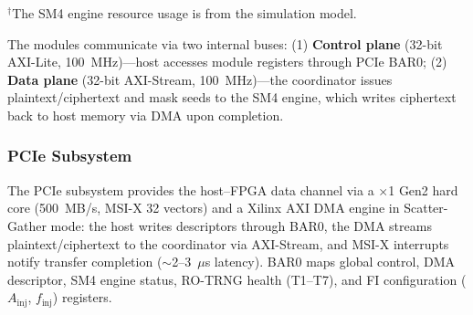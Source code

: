 \documentclass[journal]{IEEEtran}
\begin{document}
\begin{table}[t]
\renewcommand{\arraystretch}{1.1}
\caption{Functional Module Specification}
\label{tab:modules}
\footnotesize $^{\dagger}$The SM4 engine resource usage is from the simulation model.
\end{table}

The modules communicate via two internal buses: (1) \textbf{Control plane} (32-bit AXI-Lite, 100~MHz)---host accesses module registers through PCIe BAR0; (2) \textbf{Data plane} (32-bit AXI-Stream, 100~MHz)---the coordinator issues plaintext/ciphertext and mask seeds to the SM4 engine, which writes ciphertext back to host memory via DMA upon completion.

\subsubsection{PCIe Subsystem}

The PCIe subsystem provides the host--FPGA data channel via a $\times$1 Gen2 hard core (500~MB/s, MSI-X 32 vectors) and a Xilinx AXI DMA engine in Scatter-Gather mode: the host writes descriptors through BAR0, the DMA streams plaintext/ciphertext to the coordinator via AXI-Stream, and MSI-X interrupts notify transfer completion ($\sim$2--3~$\mu$s latency). BAR0 maps global control, DMA descriptor, SM4 engine status, RO-TRNG health (T1--T7), and FI configuration ($A_{\text{inj}}$, $f_{\text{inj}}$) registers.
\end{document}
